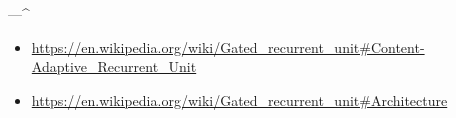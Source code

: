 ---^
\begin{itemize}
    \item \url{https://en.wikipedia.org/wiki/Gated_recurrent_unit#Content-Adaptive_Recurrent_Unit}
    \item \url{https://en.wikipedia.org/wiki/Gated_recurrent_unit#Architecture}
\end{itemize}

